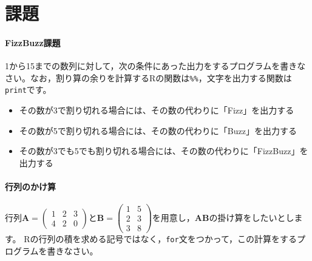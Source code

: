 \documentclass{ltjsbook}
\begin{document}
\section{課題}
\paragraph{FizzBuzz課題}
1から15までの数列に対して，次の条件にあった出力をするプログラムを書きなさい。なお，割り算の余りを計算するRの関数は\verb|%%|，文字を出力する関数は\verb|print|です。
\begin{itemize}
    \item その数が3で割り切れる場合には、その数の代わりに「Fizz」を出力する
    \item その数が5で割り切れる場合には、その数の代わりに「Buzz」を出力する
    \item その数が3でも5でも割り切れる場合には、その数の代わりに「FizzBuzz」を出力する
\end{itemize}

\paragraph{行列のかけ算}
行列$\bm{A} = \begin{pmatrix}1&2&3\\4&2&0\end{pmatrix}$と$\bm{B}=\begin{pmatrix}1&5\\2&3\\3&8\end{pmatrix}$を用意し，$\bm{AB}$の掛け算をしたいとします。
Rの行列の積を求める記号ではなく，\verb|for|文をつかって，この計算をするプログラムを書きなさい。
\end{document}
